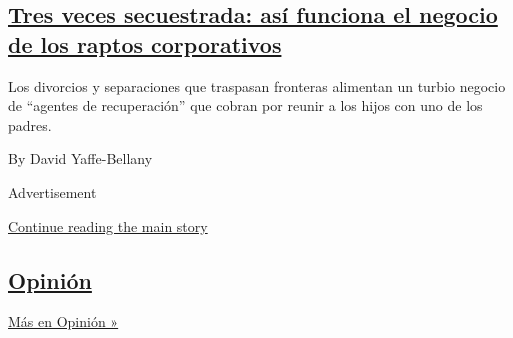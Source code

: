 \begin{enumerate}
{  \subsection{\texorpdfstring{\href{/es/2020/08/19/espanol/negocios/secuestros-internacionales-ninos-divorcio.html}{Tres
  veces secuestrada: así funciona el negocio de los raptos
  corporativos}}{Tres veces secuestrada: así funciona el negocio de los raptos corporativos}}\label{tres-veces-secuestrada-asuxed-funciona-el-negocio-de-los-raptos-corporativos}}

  Los divorcios y separaciones que traspasan fronteras alimentan un
  turbio negocio de ``agentes de recuperación'' que cobran por reunir a
  los hijos con uno de los padres.

  By David Yaffe-Bellany
\end{enumerate}

Advertisement

\protect\hyperlink{after-mid1}{Continue reading the main story}

\hypertarget{opiniuxf3n}{%
\subsection{\texorpdfstring{\href{/es/section/opinion}{Opinión}}{Opinión}}\label{opiniuxf3n}}

\href{/es/section/opinion}{Más en Opinión »}


